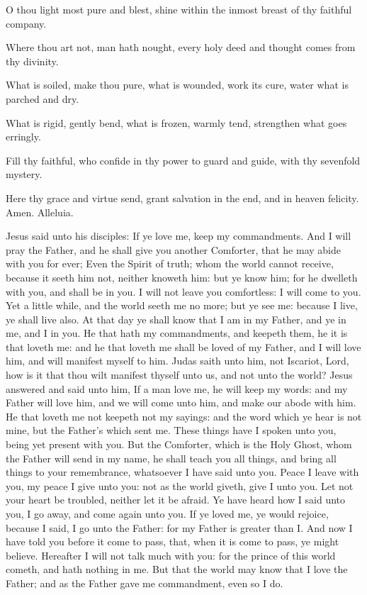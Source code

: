 O thou light most pure and blest, shine within the inmost breast of thy faithful company.

Where thou art not, man hath nought, every holy deed and thought comes from thy divinity.

What is soiled, make thou pure, what is wounded, work its cure, water what is parched and dry.

What is rigid, gently bend, what is frozen, warmly tend, strengthen what goes erringly.

Fill thy faithful, who confide in thy power to guard and guide, with thy sevenfold mystery.

Here thy grace and virtue send, grant salvation in the end, and in heaven felicity. Amen. Alleluia.

 Jesus said unto his disciples: If ye love me, keep my commandments. And I will pray the Father, and he shall give you another Comforter, that he may abide with you for ever; Even the Spirit of truth; whom the world cannot receive, because it seeth him not, neither knoweth him: but ye know him; for he dwelleth with you, and shall be in you. I will not leave you comfortless: I will come to you. Yet a little while, and the world seeth me no more; but ye see me: because I live, ye shall live also. At that day ye shall know that I am in my Father, and ye in me, and I in you. He that hath my commandments, and keepeth them, he it is that loveth me: and he that loveth me shall be loved of my Father, and I will love him, and will manifest myself to him. Judas saith unto him, not Iscariot, Lord, how is it that thou wilt manifest thyself unto us, and not unto the world? Jesus answered and said unto him, If a man love me, he will keep my words: and my Father will love him, and we will come unto him, and make our abode with him. He that loveth me not keepeth not my sayings: and the word which ye hear is not mine, but the Father's which sent me. These things have I spoken unto you, being yet present with you. But the Comforter, which is the Holy Ghost, whom the Father will send in my name, he shall teach you all things, and bring all things to your remembrance, whatsoever I have said unto you. Peace I leave with you, my peace I give unto you: not as the world giveth, give I unto you. Let not your heart be troubled, neither let it be afraid. Ye have heard how I said unto you, I go away, and come again unto you. If ye loved me, ye would rejoice, because I said, I go unto the Father: for my Father is greater than I. And now I have told you before it come to pass, that, when it is come to pass, ye might believe. Hereafter I will not talk much with you: for the prince of this world cometh, and hath nothing in me. But that the world may know that I love the Father; and as the Father gave me commandment, even so I do.

